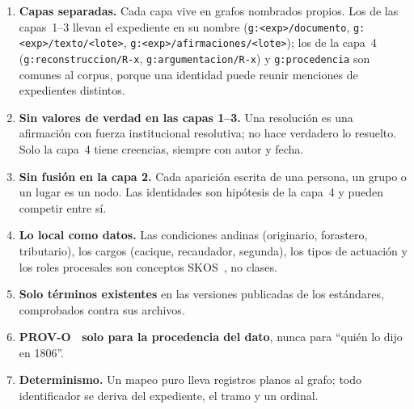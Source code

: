 \documentclass[runningheads]{llncs}
\newcommand{\ttt}[1]{\texttt{\small #1}}
\begin{document}
\begin{enumerate}
\item \textbf{Capas separadas.} Cada capa vive en grafos nombrados propios. Los de las capas~1--3 llevan el
  expediente en su nombre (\ttt{g:<exp>/documento}, \ttt{g:<exp>/texto/<lote>}, \ttt{g:<exp>/afirmaciones/<lote>});
  los de la capa~4 (\ttt{g:reconstruccion/R-x}, \ttt{g:argumentacion/R-x}) y \ttt{g:procedencia} son comunes al
  corpus, porque una identidad puede reunir menciones de expedientes distintos.
\item \textbf{Sin valores de verdad en las capas 1--3.} Una resolución es una afirmación con fuerza institucional
  resolutiva; no hace verdadero lo resuelto. Solo la capa~4 tiene creencias, siempre con autor y fecha.
\item \textbf{Sin fusión en la capa 2.} Cada aparición escrita de una persona, un grupo o un lugar es un nodo. Las
  identidades son hipótesis de la capa~4 y pueden competir entre sí.
\item \textbf{Lo local como datos.} Las condiciones andinas (originario, forastero, tributario), los cargos
  (cacique, recaudador, segunda), los tipos de actuación y los roles procesales son conceptos SKOS~\cite{skos}, no
  clases.
\item \textbf{Solo términos existentes} en las versiones publicadas de los estándares, comprobados contra sus
  archivos.
\item \textbf{PROV-O~\cite{provo} solo para la procedencia del dato}, nunca para \enquote{quién lo dijo en 1806}.
\item \textbf{Determinismo.} Un mapeo puro lleva registros planos al grafo; todo identificador se deriva del
  expediente, el tramo y un ordinal.
\end{enumerate}
\end{document}
